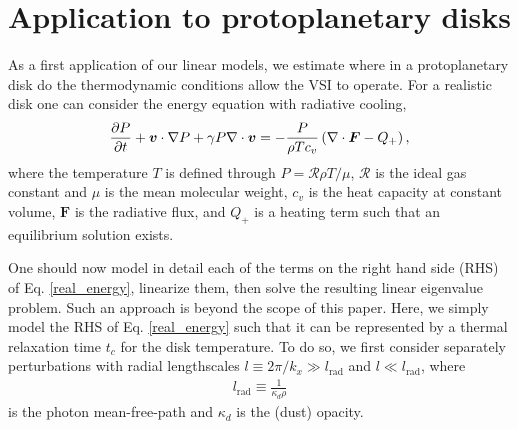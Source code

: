 \section{Application to protoplanetary disks}\label{application} 
As a first application of our linear models, we estimate where in a
protoplanetary disk do the thermodynamic conditions allow the VSI to
operate. For a realistic disk one can consider the energy equation with
radiative cooling, 
\begin{align}\label{real_energy}
\frac{\partial P}{\partial t} + \bm{v}\cdot\nabla P +\gamma P \nabla\cdot\bm{v} = - \frac{P}{\rho T
  c_v}\left(\nabla\cdot\bm{F} - Q_+\right), 
\end{align}where the temperature $T$ is defined through $P=\mathcal{R}\rho
T/\mu$, $\mathcal{R}$ is the ideal gas constant and $\mu$ is
the mean molecular weight, $c_v$ is the heat capacity at constant
volume, 
$\bm{F}$ is the radiative flux, and $Q_+$ is a heating
term such that an equilibrium solution exists. 

One should now model in detail each of the terms on the right
hand side (RHS) of Eq. \ref{real_energy}, linearize them, then solve
the resulting linear eigenvalue problem. Such an approach is beyond
the scope of this paper. Here, we simply model the RHS of
Eq. \ref{real_energy} such that it can be represented by a 
thermal relaxation time $t_c$ for the disk temperature. 
To do so, we first consider separately perturbations
with radial lengthscales $l\equiv 2\pi/k_x\gg l_\mathrm{rad}$ and 
$l\ll l_\mathrm{rad}$, where      
\begin{align}\label{lrad}
  l_\mathrm{rad} \equiv \frac{1}{\kappa_d\rho} 
\end{align} 
is the photon mean-free-path and $\kappa_d$ is the (dust) opacity. 


